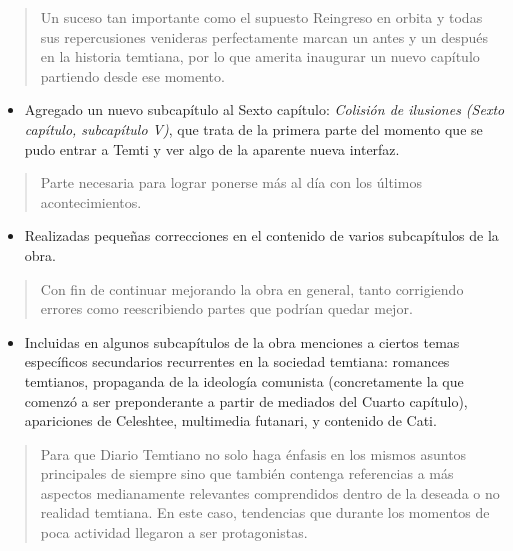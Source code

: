 \documentclass[
  spanish,
]{book}
\providecommand{\tightlist}{%
  \setlength{\itemsep}{0pt}\setlength{\parskip}{0pt}}
\begin{document}
\begin{quote}
Un suceso tan importante como el supuesto Reingreso en orbita y todas sus repercusiones venideras perfectamente marcan un antes y un después en la historia temtiana, por lo que amerita inaugurar un nuevo capítulo partiendo desde ese momento.
\end{quote}

\begin{itemize}
\tightlist
\item
  Agregado un nuevo subcapítulo al Sexto capítulo: \emph{Colisión de ilusiones (Sexto capítulo, subcapítulo V)}, que trata de la primera parte del momento que se pudo entrar a Temti y ver algo de la aparente nueva interfaz.
\end{itemize}

\begin{quote}
Parte necesaria para lograr ponerse más al día con los últimos acontecimientos.
\end{quote}

\begin{itemize}
\tightlist
\item
  Realizadas pequeñas correcciones en el contenido de varios subcapítulos de la obra.
\end{itemize}

\begin{quote}
Con fin de continuar mejorando la obra en general, tanto corrigiendo errores como reescribiendo partes que podrían quedar mejor.
\end{quote}

\begin{itemize}
\tightlist
\item
  Incluidas en algunos subcapítulos de la obra menciones a ciertos temas específicos secundarios recurrentes en la sociedad temtiana: romances temtianos, propaganda de la ideología comunista (concretamente la que comenzó a ser preponderante a partir de mediados del Cuarto capítulo), apariciones de Celeshtee, multimedia futanari, y contenido de Cati.
\end{itemize}

\begin{quote}
Para que Diario Temtiano no solo haga énfasis en los mismos asuntos principales de siempre sino que también contenga referencias a más aspectos medianamente relevantes comprendidos dentro de la deseada o no realidad temtiana. En este caso, tendencias que durante los momentos de poca actividad llegaron a ser protagonistas.
\end{quote}
\end{document}
